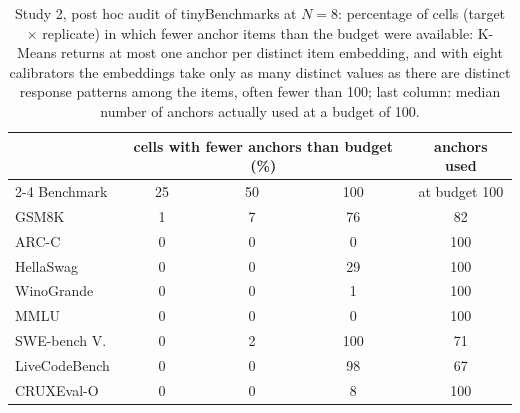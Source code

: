 \begin{table}[tbp]
\centering\footnotesize
\caption{Study 2, post hoc audit of tinyBenchmarks at $N=8$: percentage of cells (target $\times$ replicate) in which fewer anchor items than the budget were available: K-Means returns at most one anchor per distinct item embedding, and with eight calibrators the embeddings take only as many distinct values as there are distinct response patterns among the items, often fewer than 100; last column: median number of anchors actually used at a budget of 100.}
\label{tab:tinyaudit}
\begin{tabular}{@{}lcccc@{}}
\toprule
 & \multicolumn{3}{c}{cells with fewer anchors than budget (\%)} & anchors used \\
\cmidrule(lr){2-4}
Benchmark & 25 & 50 & 100 & at budget 100 \\
\midrule
GSM8K & 1 & 7 & 76 & 82 \\
ARC-C & 0 & 0 & 0 & 100 \\
HellaSwag & 0 & 0 & 29 & 100 \\
WinoGrande & 0 & 0 & 1 & 100 \\
MMLU & 0 & 0 & 0 & 100 \\
SWE-bench V. & 0 & 2 & 100 & 71 \\
LiveCodeBench & 0 & 0 & 98 & 67 \\
CRUXEval-O & 0 & 0 & 8 & 100 \\
\bottomrule
\end{tabular}
\end{table}
